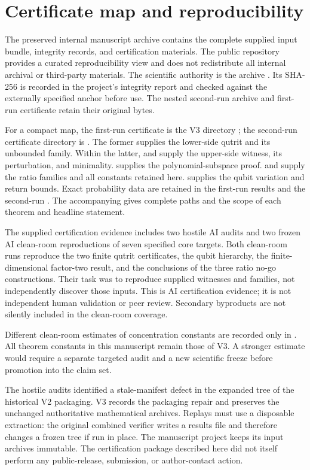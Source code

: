\section{Certificate map and reproducibility}\label{app:reproducibility}
The preserved internal manuscript archive contains the complete supplied input bundle,
integrity records, and certification materials. The public repository provides a curated
reproducibility view and does not redistribute all internal archival or third-party materials. The scientific
authority is the archive
.
Its SHA-256 is recorded in the project's integrity report and checked
against the externally specified anchor before use. The nested second-run
archive and first-run certificate retain their original bytes.

For a compact map, the first-run certificate is the V3 directory
; the second-run certificate
directory is
.
The former supplies the lower-side qutrit and its unbounded family.
Within the latter,  and
 supply the upper-side witness,
its perturbation, and minimality. 
supplies the polynomial-subspace proof. 
and  supply the ratio families and all
constants retained here.  supplies
the qubit variation and return bounds. Exact probability data are retained
in the first-run results and the second-run
. The accompanying
 gives complete paths and the scope of
each theorem and headline statement.

The supplied certification evidence includes two hostile AI audits and
two frozen AI clean-room reproductions of seven specified core targets.
Both clean-room runs reproduce the two finite qutrit certificates,
the qubit hierarchy, the finite-dimensional factor-two result, and
the conclusions of the three ratio no-go constructions. Their task was
to reproduce supplied witnesses and families, not independently discover
those inputs. This is AI certification evidence; it is not independent
human validation or peer review. Secondary byproducts are not silently
included in the clean-room coverage.

Different clean-room estimates of concentration constants are recorded
only in . All theorem
constants in this manuscript remain those of V3. A stronger estimate would
require a separate targeted audit and a new scientific freeze before
promotion into the claim set.

The hostile audits identified a stale-manifest defect in the expanded
tree of the historical V2 packaging. V3 records the packaging repair and
preserves the unchanged authoritative mathematical archives. Replays must
use a disposable extraction: the original combined verifier writes a
results file and therefore changes a frozen tree if run in place.
The manuscript project keeps its input archives immutable. The certification package described here did not itself
perform any public-release, submission, or author-contact
action.
